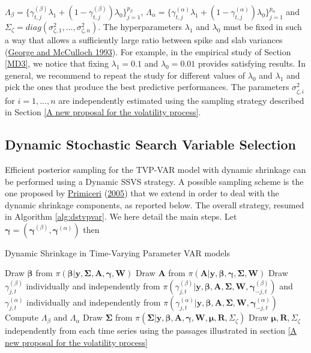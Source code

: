 \documentclass[
  12pt,
]{book}
\theoremstyle{break}
\theoremstyle{nonumberplain}
\begin{document}
\(\Lambda_{\beta}=\{\gamma_{t,j}^{(\beta)}\lambda_{1}+(1-\gamma_{t,j}^{(\beta)})\lambda_0\}_{j=1}^{p_{\beta}}\),
\(\Lambda_{\alpha}=\{\gamma_{t,j}^{(\alpha)}\lambda_{1}+(1-\gamma_{t,j}^{(\alpha)})\lambda_0\}_{j=1}^{p_{\alpha}}\)
and
\(\Sigma_{\zeta}=diag(\sigma^{2}_{\zeta,1},...,\sigma^{2}_{\zeta,n})\).
The hyperparameters \(\lambda_1\) and \(\lambda_0\) must be fixed in
such a way that allows a sufficiently large ratio between spike and slab
variances (\protect\hyperlink{ref-GM_1993}{George and McCulloch 1993}).
For example, in the empirical study of Section \ref{MD3}, we notice that
fixing \(\lambda_1=0.1\) and \(\lambda_0=0.01\) provides satisfying
results. In general, we recommend to repeat the study for different
values of \(\lambda_0\) and \(\lambda_1\) and pick the ones that produce
the best predictive performances. The parameters
\(\sigma_{\zeta,i}^{2}\) for \(i=1,...,n\) are independently estimated
using the sampling strategy described in Section
\ref{A new proposal for the volatility process}.

\subsection{Dynamic Stochastic Search Variable Selection}

Efficient posterior sampling for the TVP-VAR model with dynamic
shrinkage can be performed using a Dynamic SSVS strategy. A possible
sampling scheme is the one proposed by
\protect\hyperlink{ref-Primicieri_2005}{Primiceri}
(\protect\hyperlink{ref-Primicieri_2005}{2005}) that we extend in order
to deal with the dynamic shrinkage components, as reported below. The
overall strategy, resumed in Algorithm \ref{alg:dstvpvar}. We here
detail the main steps. Let
\(\boldsymbol{\gamma}=(\boldsymbol{\gamma}^{(\beta)},\boldsymbol{\gamma}^{(\alpha)})\)
then

\begingroup
\LinesNumbered
\begin{algorithm}[t]
\caption{Dynamic Shrinkage in Time-Varying Parameter VAR models} \label{alg:dstvpvar}
 Draw $\boldsymbol{\beta}$ from $\pi(\boldsymbol{\beta}|\boldsymbol{y},\boldsymbol{\Sigma},\boldsymbol{A},\boldsymbol{\gamma},\boldsymbol{W})$ \;
 Draw $\boldsymbol{A}$ from $\pi(\boldsymbol{A}|\boldsymbol{y},\boldsymbol{\beta},\boldsymbol{\gamma},\boldsymbol{\Sigma},\boldsymbol{W})$ \;
 Draw $\gamma_{j,t}^{(\beta)}$ individually and independently from $\pi(\gamma_{j,t}^{(\beta)}|\boldsymbol{y},\boldsymbol{\beta},\boldsymbol{A},\boldsymbol{\Sigma},\boldsymbol{W},\boldsymbol{\gamma}_{-j,t}^{(\beta)})$ and $\gamma_{j,t}^{(\alpha)}$ individually and independently from $\pi(\gamma_{j,t}^{(\alpha)}|\boldsymbol{y},\boldsymbol{\beta},\boldsymbol{A},\boldsymbol{\Sigma},\boldsymbol{W},\boldsymbol{\gamma}_{-j,t}^{(\alpha)})$ \;
 Compute $\Lambda_{\beta}$ and $\Lambda_{\alpha}$\;
 Draw $\boldsymbol{\Sigma}$ from $\pi(\boldsymbol{\Sigma}|\boldsymbol{y},\boldsymbol{\beta},\boldsymbol{A},\boldsymbol{\gamma},\boldsymbol{W},\boldsymbol{\mu},\boldsymbol{R},\Sigma_{\zeta})$ \;
 Draw $\boldsymbol{\mu},\boldsymbol{R},\Sigma_{\zeta}$ independently from each time series using the passages illustrated in section \ref{A new proposal for the volatility process} \;
\end{algorithm}
\end{document}
